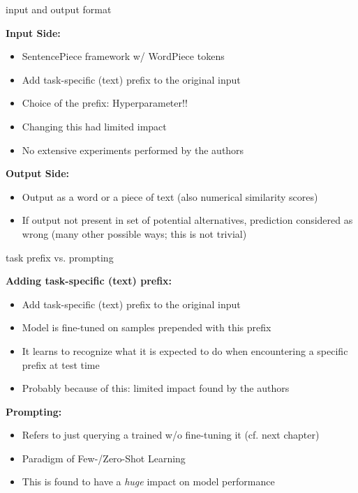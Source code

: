 \documentclass[11pt,compress,t,notes=noshow, xcolor=table]{beamer}
\begin{document}
\begin{frame}{input and output format}

\vfill

	\textbf{Input Side:}

	\begin{itemize}
		\item SentencePiece framework w/ WordPiece tokens
		\item Add task-specific (text) prefix to the original input
		\item Choice of the prefix: Hyperparameter!! 
		\item[$\to$] Changing this had limited impact
		\item[$\to$] No extensive experiments performed by the authors
	\end{itemize}
	
	\vspace{.5cm}

	\textbf{Output Side:}

	\begin{itemize}
		\item Output as a word or a piece of text (also numerical similarity scores)
		\item If output not present in set of potential alternatives, prediction considered as wrong (many other possible ways; this is not trivial)
	\end{itemize}
	
\vfill

\end{frame}


\begin{frame}{task prefix vs. prompting}

\vfill

	\textbf{Adding task-specific (text) prefix:}

	\begin{itemize}
		\item Add task-specific (text) prefix to the original input
		\item Model is fine-tuned on samples prepended with this prefix
		\item[$\to$] It learns to recognize what it is expected to do when encountering a specific prefix at test time
		\item[$\to$] Probably because of this: limited impact found by the authors
	\end{itemize}
	
	\vspace{.5cm}

	\textbf{Prompting:}

	\begin{itemize}
		\item Refers to just querying a trained w/o fine-tuning it (cf. next chapter)
		\item Paradigm of Few-/Zero-Shot Learning
		\item This is found to have a \textit{huge} impact on model performance
	\end{itemize}
	
\vfill

\end{frame}
\end{document}
